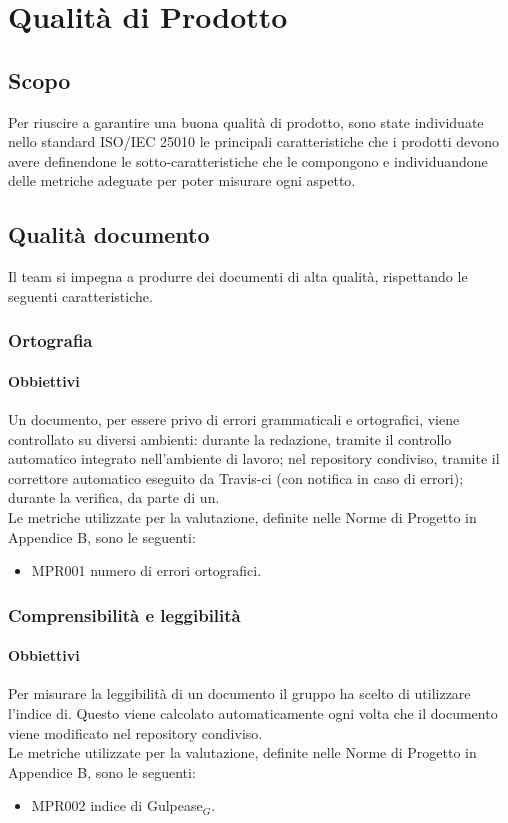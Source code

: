 \chapter{Qualità di Prodotto}
\label{prodotto}
\section{Scopo}
Per riuscire a garantire una buona qualità di prodotto, sono state individuate nello standard ISO/IEC 25010 le principali caratteristiche che i prodotti devono avere definendone le sotto-caratteristiche che le compongono e individuandone delle metriche adeguate per poter misurare ogni aspetto.

\section{Qualità documento}
\label{documento}
Il team si impegna a produrre dei documenti di alta qualità, rispettando le seguenti caratteristiche.
\subsection{Ortografia}
\subsubsection{Obbiettivi}
Un documento, per essere privo di errori grammaticali e ortografici, viene controllato su diversi ambienti: durante la redazione, tramite il controllo automatico integrato nell'ambiente di lavoro; nel repository condiviso, tramite il correttore automatico eseguito da Travis-ci (con notifica in caso di errori); durante la verifica, da parte di un.\\
Le metriche utilizzate per la valutazione, definite nelle Norme di Progetto in Appendice B, sono le seguenti:
\begin{itemize}
	\item MPR001 numero di errori ortografici.
\end{itemize}
\subsection{Comprensibilità e leggibilità}
\subsubsection{Obbiettivi}
Per misurare la leggibilità di un documento il gruppo ha scelto di utilizzare l'indice di. Questo viene calcolato automaticamente ogni volta che il documento viene modificato nel repository condiviso.\\
Le metriche utilizzate per la valutazione, definite nelle Norme di Progetto in Appendice B, sono le seguenti:
\begin{itemize}
	\item MPR002 indice di Gulpease$_{G}$.
\end{itemize}
